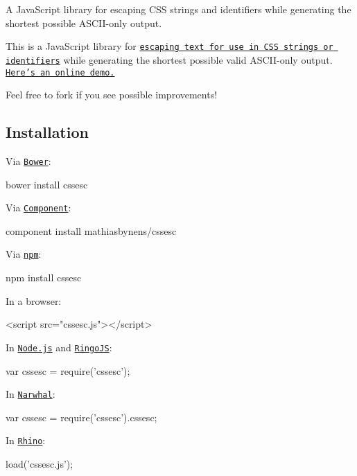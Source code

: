 A Java\+Script library for escaping C\+SS strings and identifiers while generating the shortest possible A\+S\+C\+I\+I-\/only output.

This is a Java\+Script library for \href{http://mathiasbynens.be/notes/css-escapes}{\tt escaping text for use in C\+SS strings or identifiers} while generating the shortest possible valid A\+S\+C\+I\+I-\/only output. \href{http://mothereff.in/css-escapes}{\tt Here’s an online demo.}

Feel free to fork if you see possible improvements!

\subsection*{Installation}

Via \href{http://bower.io/}{\tt Bower}\+:


\begin{DoxyCode}
bower install cssesc
\end{DoxyCode}


Via \href{https://github.com/component/component}{\tt Component}\+:


\begin{DoxyCode}
component install mathiasbynens/cssesc
\end{DoxyCode}


Via \href{http://npmjs.org/}{\tt npm}\+:


\begin{DoxyCode}
npm install cssesc
\end{DoxyCode}


In a browser\+:


\begin{DoxyCode}
<script src="cssesc.js"></script>
\end{DoxyCode}


In \href{http://nodejs.org/}{\tt Node.\+js} and \href{http://ringojs.org/}{\tt Ringo\+JS}\+:


\begin{DoxyCode}
var cssesc = require('cssesc');
\end{DoxyCode}


In \href{http://narwhaljs.org/}{\tt Narwhal}\+:


\begin{DoxyCode}
var cssesc = require('cssesc').cssesc;
\end{DoxyCode}


In \href{http://www.mozilla.org/rhino/}{\tt Rhino}\+:


\begin{DoxyCode}
load('cssesc.js');
\end{DoxyCode}


